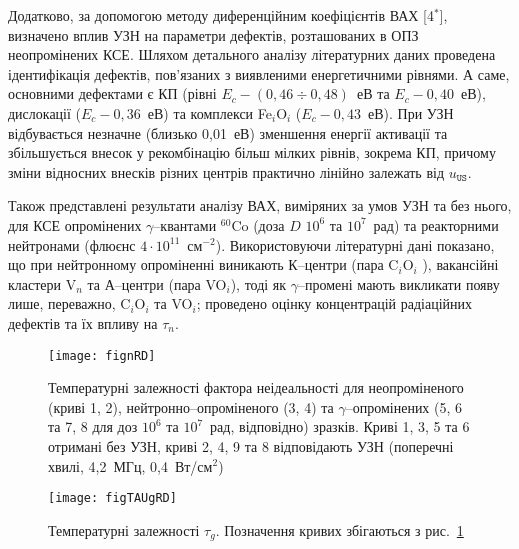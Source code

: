 Додатково, за допомогою методу диференційним коефіцієнтів ВАХ
[4$^*$], визначено вплив УЗН на параметри дефектів, розташованих в ОПЗ неопромінених КСЕ.
Шляхом детального аналізу літературних даних проведена ідентифікація дефектів, пов'язаних з виявленими енергетичними рівнями.
А саме, основними дефектами є КП (рівні $E_c-(0,46\div0,48)$~еВ та $E_c-0,40$~еВ), дислокації ($E_c-0,36$~еВ) та комплекси Fe$_i$O$_i$ ($E_c-0,43$~еВ).
При УЗН відбувається незначне (близько 0,01~еВ) зменшення енергії активації та збільшується внесок
у рекомбінацію більш мілких рівнів, зокрема КП, причому зміни відносних внесків різних центрів практично лінійно залежать від $u_\mathtt{US}$.

Також представлені результати аналізу ВАХ, виміряних за умов УЗН та без нього, для КСЕ опромінених $\gamma$--квантами $^{60}$Co (доза $D$ $10^6$ та $10^7$~рад) та реакторними нейтронами (флюєнс $4\cdot10^{11}$~см$^{-2}$).
Використовуючи літературні дані показано, що при нейтронному опроміненні виникають К--центри (пара C$_i$O$_i$ ),
вакансійні кластери V$_n$ та А--центри (пара VO$_i$), тоді як $\gamma$--промені мають викликати появу лише, переважно, C$_i$O$_i$ та VO$_i$;
проведено оцінку концентрацій радіаційних дефектів та їх впливу на $\tau_n$.

\begin{figure}[ht]
\center
\texttt{[image: fignRD]}%
\caption{\label{fignRD}
Температурні залежності фактора неідеальності
для неопроміненого (криві 1, 2),
нейтронно--опроміненого (3, 4) та
$\gamma$--опромінених (5, 6 та 7, 8 для доз $10^6$ та $10^7$~рад, відповідно)
зразків.
Криві 1, 3, 5 та 6 отримані без УЗН,
криві 2, 4, 9 та 8 відповідають УЗН (поперечні хвилі, 4,2~МГц, 0,4~Вт/см$^2$)
}%
\end{figure}


\begin{figure}[ht]
\center
\texttt{[image: figTAUgRD]}%
\caption{\label{figTAUgRD}
Температурні залежності $\tau_g$.
Позначення кривих збігаються з рис.~\ref{fignRD}
}%
\end{figure}

